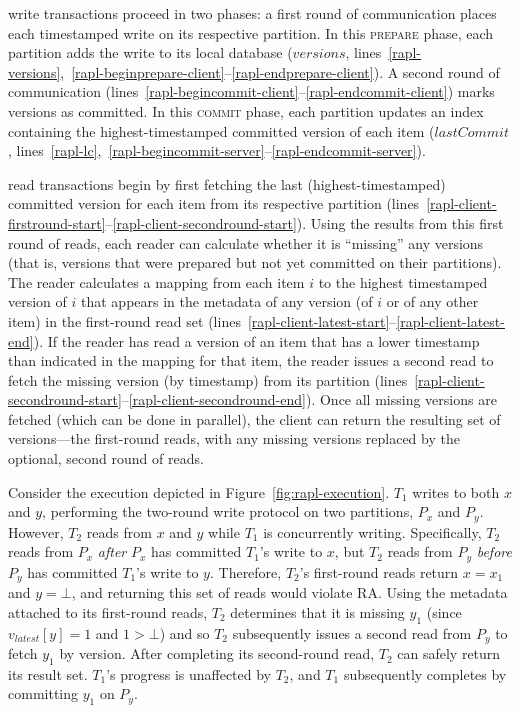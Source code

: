 \rapl write transactions proceed in two phases: a first round of
communication places each timestamped write on its respective
partition. In this \textsc{prepare} phase, each partition adds the
write to its local database ($versions$,
lines~\ref{rapl-versions},~\ref{rapl-beginprepare-client}--\ref{rapl-endprepare-client}). A
second round of communication
(lines~\ref{rapl-begincommit-client}--\ref{rapl-endcommit-client}) marks versions as committed. In this
\textsc{commit} phase, each partition updates an index containing the
highest-timestamped committed version of each item ($lastCommit$,
lines~\ref{rapl-lc},~\ref{rapl-begincommit-server}--\ref{rapl-endcommit-server}).

\rapl read transactions begin by first fetching the last
(highest-timestamped) committed version for each item from its
respective partition
(lines~\ref{rapl-client-firstround-start}--\ref{rapl-client-secondround-start}). Using
the results from this first round of reads, each reader can calculate
whether it is ``missing'' any versions (that is, versions that were
prepared but not yet committed on their partitions). The reader
calculates a mapping from each item $i$ to the highest timestamped
version of $i$ that appears in the metadata of any version (of $i$ or
of any other item) in the first-round read set
(lines~\ref{rapl-client-latest-start}--\ref{rapl-client-latest-end}). If
the reader has read a version of an item that has a lower timestamp
than indicated in the mapping for that item, the reader issues a
second read to fetch the missing version (by timestamp) from its
partition
(lines~\ref{rapl-client-secondround-start}--\ref{rapl-client-secondround-end}). Once
all missing versions are fetched (which can be done in parallel), the
client can return the resulting set of versions---the first-round
reads, with any missing versions replaced by the optional, second
round of reads.

 Consider the \rapl execution depicted in
Figure~\ref{fig:rapl-execution}. $T_1$ writes to both $x$ and $y$,
performing the two-round write protocol on two partitions, $P_x$ and
$P_y$. However, $T_2$ reads from $x$ and $y$ while $T_1$ is
concurrently writing.  Specifically, $T_2$ reads from $P_x$
\textit{after} $P_x$ has committed $T_1$'s write to $x$, but $T_2$
reads from $P_y$ \textit{before} $P_y$ has committed $T_1$'s write to
$y$. Therefore, $T_2$'s first-round reads return $x=x_1$ and $y=\bot$,
and returning this set of reads would violate RA. Using the metadata
attached to its first-round reads, $T_2$ determines that it is missing
$y_1$ (since $v_{latest}[y]=1$ and $1 > \bot$) and so $T_2$
subsequently issues a second read from $P_y$ to fetch $y_1$ by
version. After completing its second-round read, $T_2$ can safely
return its result set. $T_1$'s progress is unaffected by $T_2$, and
$T_1$ subsequently completes by committing $y_1$ on $P_y$.



